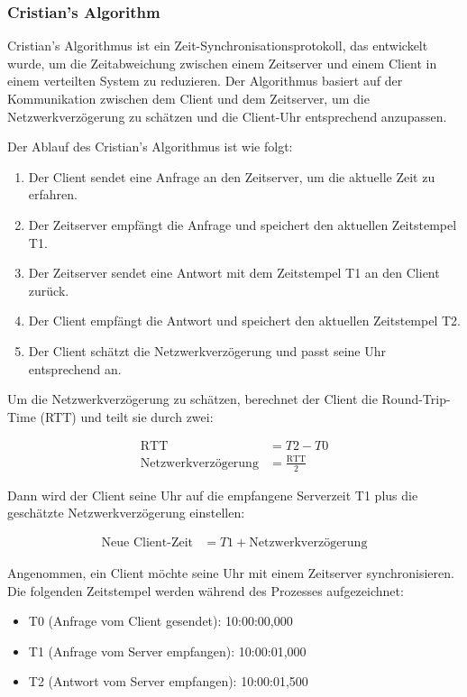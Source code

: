 \subsubsection{Cristian's Algorithm}
Cristian's Algorithmus ist ein Zeit-Synchronisationsprotokoll, das entwickelt wurde, um die Zeitabweichung zwischen einem Zeitserver und einem Client in einem verteilten System zu reduzieren. Der Algorithmus basiert auf der Kommunikation zwischen dem Client und dem Zeitserver, um die Netzwerkverzögerung zu schätzen und die Client-Uhr entsprechend anzupassen.

Der Ablauf des Cristian's Algorithmus ist wie folgt:

\begin{enumerate}
\item Der Client sendet eine Anfrage an den Zeitserver, um die aktuelle Zeit zu erfahren.
\item Der Zeitserver empfängt die Anfrage und speichert den aktuellen Zeitstempel T1.
\item Der Zeitserver sendet eine Antwort mit dem Zeitstempel T1 an den Client zurück.
\item Der Client empfängt die Antwort und speichert den aktuellen Zeitstempel T2.
\item Der Client schätzt die Netzwerkverzögerung und passt seine Uhr entsprechend an.
\end{enumerate}

Um die Netzwerkverzögerung zu schätzen, berechnet der Client die Round-Trip-Time (RTT) und teilt sie durch zwei:

\begin{align*}
\text{RTT} &= T2 - T0 \\
\text{Netzwerkverzögerung} &= \frac{\text{RTT}}{2}
\end{align*}

Dann wird der Client seine Uhr auf die empfangene Serverzeit T1 plus die geschätzte Netzwerkverzögerung einstellen:

\begin{align*}
\text{Neue Client-Zeit} &= T1 + \text{Netzwerkverzögerung}
\end{align*}

Angenommen, ein Client möchte seine Uhr mit einem Zeitserver synchronisieren. Die folgenden Zeitstempel werden während des Prozesses aufgezeichnet:

\begin{itemize}
\item T0 (Anfrage vom Client gesendet): 10:00:00,000
\item T1 (Anfrage vom Server empfangen): 10:00:01,000
\item T2 (Antwort vom Server empfangen): 10:00:01,500
\end{itemize}

